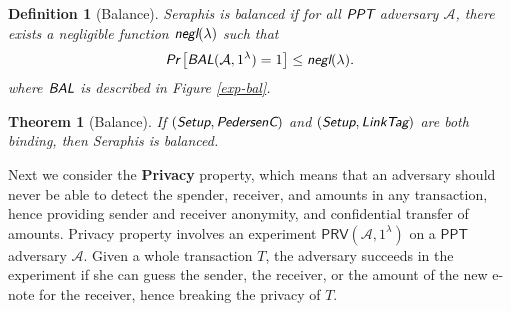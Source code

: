 \documentclass{article}
\newtheorem{definition}{Definition}[section]
\newtheorem{theorem}{Theorem}[section]
\begin{document}
\begin{definition}[Balance]
Seraphis is balanced if for all $\emph{\textsf{PPT}}$ adversary $\mathcal{A}$, there exists a negligible function $\emph{\textsf{negl}}(\lambda)$ such that
\begin{align*}
\emph{\textsf{Pr}}
\left[
\emph{\textsf{BAL}}(\mathcal{A}, 1^{\lambda})=1
\right]
\le \emph{\textsf{negl}}(\lambda).
\end{align*}
where $\emph{\textsf{BAL}}$ is described in Figure \ref{exp-bal}.
\end{definition}
\begin{theorem}[Balance]\label{thm-bal}
If $(\emph{\textsf{Setup}},\emph{\textsf{PedersenC}})$ and $(\emph{\textsf{Setup}},\emph{\textsf{LinkTag}})$ are both binding, then Seraphis is balanced.  
\end{theorem}
Next we consider the \textbf{Privacy} property, which means that an adversary should never be able to detect the spender, receiver, and amounts in any transaction, hence providing sender and receiver anonymity, and confidential transfer of amounts. Privacy property involves an experiment $\textsf{PRV}(\mathcal{A}, 1^{\lambda})$ on a $\textsf{PPT}$ adversary $\mathcal{A}$. Given a whole transaction $T$, the adversary succeeds in the experiment if she can guess the sender, the receiver, or the amount of the new e-note for the receiver, hence breaking the privacy of $T$.
\end{document}
